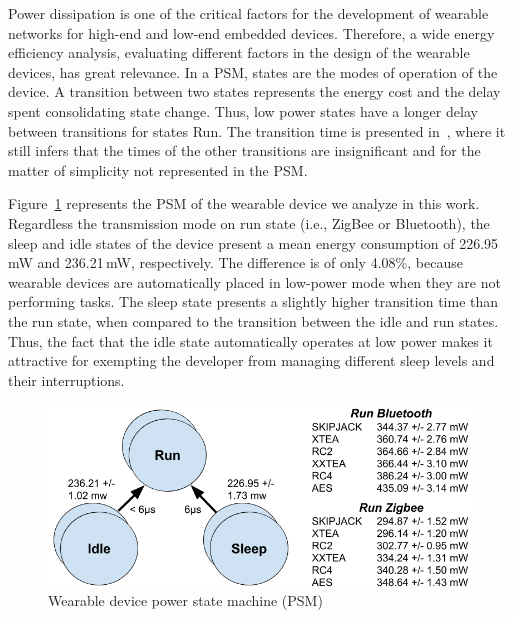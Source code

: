 
Power dissipation is one of the critical factors for the development of wearable networks for high-end and low-end embedded devices. Therefore, a wide energy efficiency analysis, evaluating different factors in the design of the wearable devices, has great relevance. 
In a PSM, states are the modes of operation of the device. A transition between two states represents the energy cost and the delay spent consolidating state change. Thus, low power  states  have  a  longer  delay  between  transitions for states Run. The transition  time  is presented in~\cite{goraczko2008energy}, where it still infers that the times of the other transitions are insignificant and for the matter of simplicity not represented in the PSM.


Figure~\ref{fig:PSM_geral} represents the PSM of the wearable device we analyze in this work. %
Regardless the transmission mode on run state (i.e., ZigBee or Bluetooth), the sleep and idle states of the device present a mean energy consumption of 226.95\,mW and 236.21\,mW, respectively. The difference is of only 4.08\%, because wearable devices are automatically placed in low-power mode when they are not performing tasks. The sleep state presents a slightly higher transition time than the run state, when compared to the transition between the idle and run states. Thus, the fact that the idle state automatically operates at low power makes it attractive for exempting the developer from managing different sleep levels and their interruptions. 


\begin{figure}[tbh]
  \centering
  \includegraphics[scale=0.3]{Figures/C_PSM_geral.png}
  \caption{Wearable device power state machine (PSM)}
  \label{fig:PSM_geral}
\end{figure}

